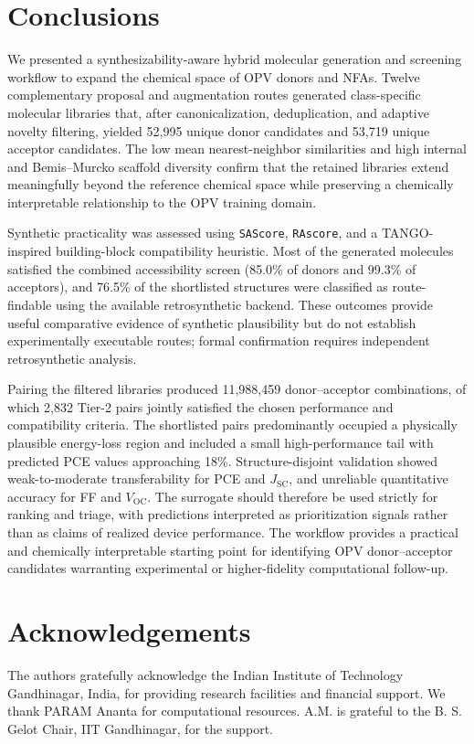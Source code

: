 \documentclass[12pt]{article}
\newcommand{\voc}{$V_\mathrm{OC}$}
\newcommand{\jsc}{$J_\mathrm{SC}$}
\begin{document}
\section{Conclusions}
We presented a synthesizability-aware hybrid molecular generation and screening workflow to expand the chemical space of OPV donors and NFAs. Twelve complementary proposal and augmentation routes generated class-specific molecular libraries that, after canonicalization, deduplication, and adaptive novelty filtering, yielded 52{,}995 unique donor candidates and 53{,}719 unique acceptor candidates. The low mean nearest-neighbor similarities and high internal and Bemis--Murcko scaffold diversity confirm that the retained libraries extend meaningfully beyond the reference chemical space while preserving a chemically interpretable relationship to the OPV training domain.

Synthetic practicality was assessed using \texttt{SAScore}, \texttt{RAscore}, and a TANGO-inspired building-block compatibility heuristic. Most of the generated molecules satisfied the combined accessibility screen (85.0\% of donors and 99.3\% of acceptors), and 76.5\% of the shortlisted structures were classified as route-findable using the available retrosynthetic backend. These outcomes provide useful comparative evidence of synthetic plausibility but do not establish experimentally executable routes; formal confirmation requires independent retrosynthetic analysis.

Pairing the filtered libraries produced 11{,}988{,}459 donor--acceptor combinations, of which 2{,}832 Tier-2 pairs jointly satisfied the chosen performance and compatibility criteria. The shortlisted pairs predominantly occupied a physically plausible energy-loss region and included a small high-performance tail with predicted PCE values approaching 18\%. Structure-disjoint validation showed weak-to-moderate transferability for PCE and \jsc, and unreliable quantitative accuracy for FF and \voc. The surrogate should therefore be used strictly for ranking and triage, with predictions interpreted as prioritization signals rather than as claims of realized device performance. The workflow provides a practical and chemically interpretable starting point for identifying OPV donor--acceptor candidates warranting experimental or higher-fidelity computational follow-up.


\section{Acknowledgements}
The authors gratefully acknowledge the Indian Institute of Technology Gandhinagar, India, for providing research facilities and financial support. We thank PARAM Ananta for computational resources. A.M. is grateful to the B. S. Gelot Chair, IIT Gandhinagar,
for the support.
\end{document}
